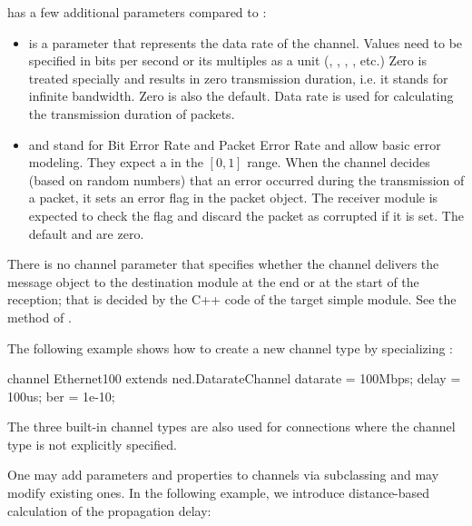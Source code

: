  has a few additional parameters compared to :

\begin{itemize}
    \item {} is a  parameter that represents the
          data rate of the channel. Values need to be specified
          in bits per second or its multiples as a unit (,
          , , , etc.) Zero is treated
          specially and results in zero transmission duration, i.e.
          it stands for infinite bandwidth. Zero is also the default.
          Data rate is used for calculating the transmission duration of
          packets.
    \item {} and  stand for Bit Error Rate and Packet Error Rate
          and allow basic error modeling. They expect a 
          in the $[0,1]$ range. When the channel decides (based on random
          numbers) that an error occurred during the transmission of a packet,
          it sets an error flag in the packet object. The receiver
          module is expected to check the flag and discard the packet
          as corrupted if it is set. The default  and 
          are zero.
\end{itemize}

\begin{note}
    There is no channel parameter that specifies whether the channel
    delivers the message object to the destination module at the end or
    at the start of the reception; that is decided by the C++ code
    of the target simple module. See the 
    method of .
\end{note}

The following example shows how to create a new channel type by
specializing :

\begin{ned}
channel Ethernet100 extends ned.DatarateChannel
{
    datarate = 100Mbps;
    delay = 100us;
    ber = 1e-10;
}
\end{ned}

\begin{note}
    The three built-in channel types are also used for connections where
    the channel type is not explicitly specified.
\end{note}

One may add parameters and properties to channels via subclassing and
may modify existing ones. In the following example, we introduce distance-based
calculation of the propagation delay:

